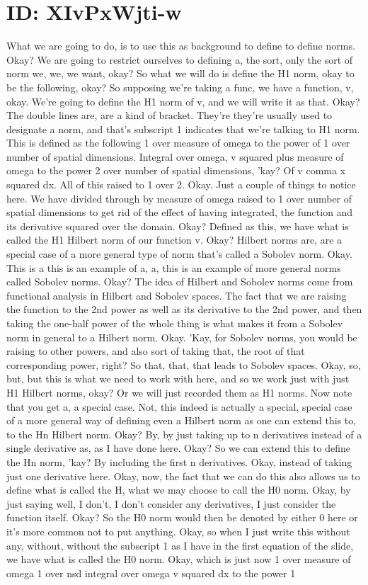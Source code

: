 \documentclass[10pt]{article}
\begin{document}
{\section*{ID: XIvPxWjti-w}
What we are going to do, is to use this as background to define to define norms. Okay? We are going to restrict ourselves to defining a, the sort, only the sort of norm we, we, we want, okay? So what we will do is define the H1 norm, okay to be the following, okay? So supposing we're taking a func, we have a function, v, okay. We're going to define the H1 norm of v, and we will write it as that. Okay? The double lines are, are a kind of bracket. They're they're usually used to designate a norm, and that's subscript 1 indicates that we're talking to H1 norm. This is defined as the following 1 over measure of omega to the power of 1 over number of spatial dimensions. Integral over omega, v squared plus measure of omega to the power 2 over number of spatial dimensions, 'kay? Of v comma x squared dx. All of this raised to 1 over 2. Okay. Just a couple of things to notice here. We have divided through by measure of omega raised to 1 over number of spatial dimensions to get rid of the effect of having integrated, the function and its derivative squared over the domain. Okay? Defined as this, we have what is called the H1 Hilbert norm of our function v. Okay? Hilbert norms are, are a special case of a more general type of norm that's called a Sobolev norm. Okay. This is a this is an example of a, a, this is an example of more general norms called Sobolev norms. Okay? The idea of Hilbert and Sobolev norms come from functional analysis in Hilbert and Sobolev spaces. The fact that we are raising the function to the 2nd power as well as its derivative to the 2nd power, and then taking the one-half power of the whole thing is what makes it from a Sobolev norm in general to a Hilbert norm. Okay. 'Kay, for Sobolev norms, you would be raising to other powers, and also sort of taking that, the root of that corresponding power, right? So that, that, that leads to Sobolev spaces. Okay, so, but, but this is what we need to work with here, and so we work just with just H1 Hilbert norms, okay? Or we will just recorded them as H1 norms. Now note that you get a, a special case. Not, this indeed is actually a special, special case of a more general way of defining even a Hilbert norm as one can extend this to, to the Hn Hilbert norm. Okay? By, by just taking up to n derivatives instead of a single derivative as, as I have done here. Okay? So we can extend this to define the Hn norm, 'kay? By including the first n derivatives. Okay, instead of taking just one derivative here. Okay, now, the fact that we can do this also allows us to define what is called the H, what we may choose to call the H0 norm. Okay, by just saying well, I don't, I don't consider any derivatives, I just consider the function itself. Okay? So the H0 norm would then be denoted by either 0 here or it's more common not to put anything. Okay, so when I just write this without any, without, without the subscript 1 as I have in the first equation of the slide, we have what is called the H0 norm. Okay, which is just now 1 over measure of omega 1 over nsd integral over omega v squared dx to the power 1 }
\end{document}
